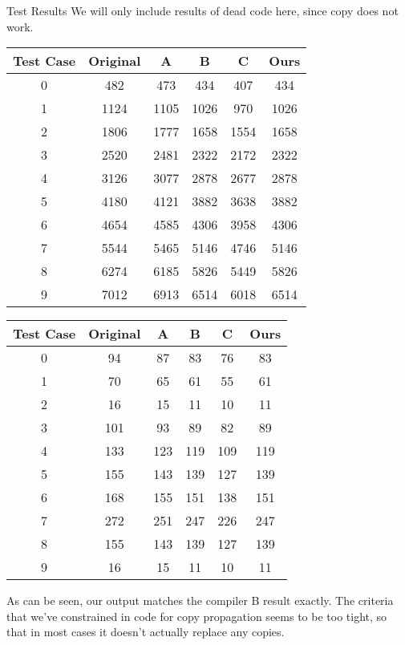 \documentclass[letterpaper,12pt]{article}
\theoremstyle{definition}
\begin{document}
	\begin{section}{Test Results}
		We will only include results of dead code here, since copy does not work.
		\begin{center}
			\begin{tabular}{| c | c | c | c | c || c |}
				\hline
				Test Case & Original & A & B & C & Ours \\
				\hline
				0 & 482 & 473 & 434 & 407 & 434 \\
				\hline
				1 & 1124 & 1105 & 1026 & 970 & 1026 \\
				\hline
				2 & 1806 & 1777 & 1658 & 1554 & 1658 \\
				\hline
				3 & 2520 & 2481 & 2322 & 2172 & 2322 \\
				\hline
				4 & 3126 & 3077 & 2878 & 2677 & 2878 \\
				\hline
				5 & 4180 & 4121 & 3882 & 3638 & 3882 \\
				\hline
				6 & 4654 & 4585 & 4306 & 3958 & 4306 \\
				\hline
				7 & 5544 & 5465 & 5146 & 4746 & 5146 \\
				\hline
				8 & 6274 & 6185 & 5826 & 5449 & 5826 \\
				\hline
				9 & 7012 & 6913 & 6514 & 6018 & 6514 \\
				\hline
			\end{tabular}
		\end{center}

		\begin{center}
			\begin{tabular}{| c | c | c | c | c || c |}
				\hline
				Test Case & Original & A & B & C & Ours \\
				\hline
				0 & 94 & 87 & 83 & 76 & 83 \\
				\hline
				1 & 70 & 65 & 61 & 55 & 61 \\
				\hline
				2 & 16 & 15 & 11 & 10 & 11 \\
				\hline
				3 & 101 & 93 & 89 & 82 & 89 \\
				\hline
				4 & 133 & 123 & 119 & 109 & 119 \\
				\hline
				5 & 155 & 143 & 139 & 127 & 139 \\
				\hline
				6 & 168 & 155 & 151 & 138 & 151 \\
				\hline
				7 & 272 & 251 & 247 & 226 & 247 \\
				\hline
				8 & 155 & 143 & 139 & 127 & 139 \\
				\hline
				9 & 16 & 15 & 11 & 10 & 11 \\
				\hline
			\end{tabular}
		\end{center}
		As can be seen, our output matches the compiler B result exactly. The criteria that we've constrained in code for copy propagation seems to be too tight, so that in most cases it doesn't actually replace any copies.
	\end{section}
\end{document}
